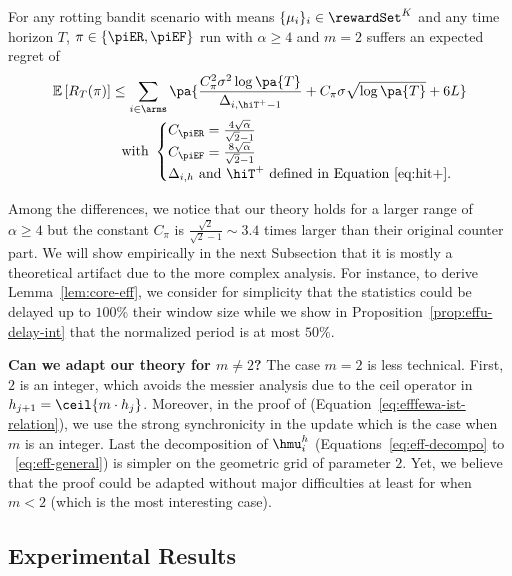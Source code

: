 \begin{theorem}\label{th:rested-PD-eff}
For any rotting bandit scenario with means $\{\mu_i\}_{i} \in \rewardSet^K$ and any time horizon $T$, $\pi \in \left\{\piER, \piEF \right\}$ run with $\alpha \geq 4$ and $m=2$ suffers an expected regret of
\begin{align*}
\mathbb{E}\left[R_T(\pi)\right]  \leq \sum_{i\in \arms} \pa{\frac{C_\pi^2\sigma^2\log\pa{T}}{\Delta_{i,\hiT^+-1}} +  C_\pi\sigma\sqrt{\log\pa{T}} +6L } \\
\text{with } 
\begin{cases}
C_{\piER} = \frac{4\sqrt{\alpha}}{\sqrt{2}-1}\\
C_{\piEF} = \frac{8\sqrt{\alpha}}{\sqrt{2}-1}\\
\text{$\Delta_{i,h}$ and $\hiT^+$ defined in Equation~\ref{eq:hit+}.}
\end{cases}
\end{align*}
\end{theorem}
Among the differences, we notice that our theory holds for a larger range of $\alpha \geq 4$ but the constant $C_\pi$ is $\frac{\sqrt{2}}{\sqrt{2}-1} \sim 3.4$ times larger than their original counter part. We will show empirically in the next Subsection that it is mostly a theoretical artifact due to the more complex analysis. For instance, to derive Lemma~\ref{lem:core-eff}, we consider for simplicity that the statistics could be delayed up to $100\%$ their window size while we show in Proposition~\ref{prop:effu-delay-int} that the normalized period is at most $50\%$.

\begin{remark}
\textbf{Can we adapt our theory for {$m\neq2$}?} The case $m=2$ is less technical. First, $2$ is an integer, which avoids the messier analysis due to the ceil operator in $h_{j+1} = \ceil{m\cdot h_j}$. Moreover, in the proof of \EFFFEWA (Equation~\ref{eq:efffewa-ist-relation}), we use the strong synchronicity in the update which is the case when $m$ is an integer. Last the decomposition of $\hmu_{i}^h$ (Equations~\ref{eq:eff-decompo} to ~\ref{eq:eff-general}) is simpler on the geometric grid of parameter $2$. Yet, we believe that the proof could be adapted without major difficulties at least for \EFFRAW when $m<2$ (which is the most interesting case). 
\end{remark}

\subsection{Experimental Results}
\label{ss:eff-exp}
